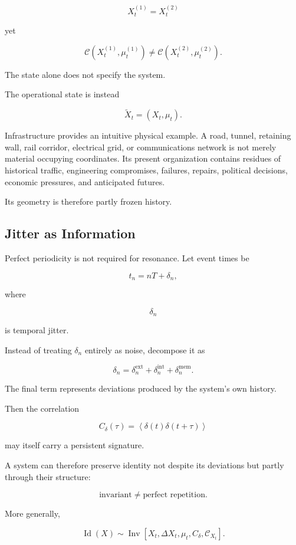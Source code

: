 \documentclass[11pt]{article}
\begin{document}
\[
X_t^{(1)}
=
X_t^{(2)}
\]

yet

\[
\mathcal{C}
\left(
X_t^{(1)},\mu_t^{(1)}
\right)
\neq
\mathcal{C}
\left(
X_t^{(2)},\mu_t^{(2)}
\right).
\]

The state alone does not specify the system.

The operational state is instead

\[
\widetilde{X}_t
=
(X_t,\mu_t).
\]

Infrastructure provides an intuitive physical example. A road, tunnel, retaining wall, rail corridor, electrical grid, or communications network is not merely material occupying coordinates. Its present organization contains residues of historical traffic, engineering compromises, failures, repairs, political decisions, economic pressures, and anticipated futures.

Its geometry is therefore partly frozen history.

\subsection{Jitter as Information}

Perfect periodicity is not required for resonance. Let event times be

\[
t_n
=
nT+\delta_n,
\]

where

\[
\delta_n
\]

is temporal jitter.

Instead of treating $\delta_n$ entirely as noise, decompose it as

\[
\delta_n
=
\delta_n^{\mathrm{ext}}
+
\delta_n^{\mathrm{int}}
+
\delta_n^{\mathrm{mem}}.
\]

The final term represents deviations produced by the system's own history.

Then the correlation

\[
C_{\delta}(\tau)
=
\left\langle
\delta(t)\delta(t+\tau)
\right\rangle
\]

may itself carry a persistent signature.

A system can therefore preserve identity not despite its deviations but partly through their structure:

\[
\boxed{
\text{invariant}
\neq
\text{perfect repetition}.
}
\]

More generally,

\[
\operatorname{Id}(X)
\sim
\operatorname{Inv}
\left[
X_t,
\Delta X_t,
\mu_t,
C_{\delta},
\mathcal{C}_{X_t}
\right].
\]
\end{document}
